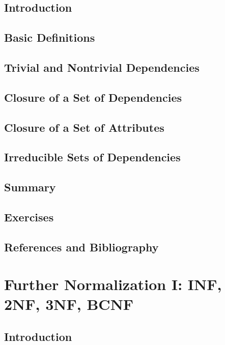 \documentclass{book}
\begin{document}
\section{Introduction}

\section{Basic Definitions}

\section{Trivial and Nontrivial Dependencies}

\section{Closure of a Set of Dependencies}

\section{Closure of a Set of Attributes}

\section{Irreducible Sets of Dependencies}

\section{Summary}

\section{Exercises}

\section{References and Bibliography}











\chapter{Further Normalization I: INF, 2NF, 3NF, BCNF}

\section{Introduction}
\end{document}
